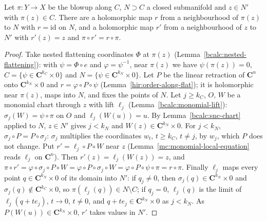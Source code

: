 \begin{lemma}
\label{bcalc:chart-retraction}
\leanok
Let \(\pi\colon Y\to X\) be the blowup along \(C\), \(N\supset C\) a closed submanifold and \(z\in N'\) with \(\pi(z)\in C\). There are a holomorphic map
\(r\) from a neighbourhood of \(\pi(z)\) to \(N\) with \(r=\mathrm{id}\) on \(N\), and a holomorphic map \(r'\) from a neighbourhood of \(z\) to \(N'\) with
\(r'(z)=z\) and \(\pi\circ r'=r\circ\pi\).
\end{lemma}
\begin{proof}
\leanok
Take nested flattening coordinates \(\Phi\) at \(\pi(z)\) (Lemma~\ref{bcalc:nested-flattening}): with \(\psi=\Phi\circ e\) and \(\varphi=\psi^{-1}\), near
\(\pi(z)\) we have \(\psi(\pi(z))=0\), \(C=\{\psi\in\mathbf C^{k_C}\times0\}\) and \(N=\{\psi\in\mathbf C^{k_N}\times0\}\). Let \(P\) be the linear retraction
of \(\mathbf C^n\) onto \(\mathbf C^{k_N}\times0\) and \(r=\varphi\circ P\circ\psi\) (Lemma~\ref{hir:order-along-flat}); it is holomorphic near \(\pi(z)\), maps into
\(N\), and fixes the points of \(N\). Let \(j\ge k_C\), \(O\), \(W\) be a monomial chart through \(z\) with lift \(\ell_j\) (Lemma~\ref{bcalc:monomial-lift}):
\(\sigma_j(W)=\psi\circ\pi\) on \(O\) and \(\ell_j(W(u))=u\). By Lemma~\ref{bcalc:snc-chart} applied to \(N\), \(z\in N'\) gives \(j<k_N\) and
\(W(z)\in\mathbf C^{k_N}\times0\). For \(j<k_N\), \(\sigma_j\circ P=P\circ\sigma_j\): \(\sigma_j\) multiplies the coordinates \(w_t\), \(t\ge k_C\), \(t\ne j\), by
\(w_j\), which \(P\) does not change. Put \(r'=\ell_j\circ P\circ W\) near \(z\) (Lemma~\ref{mc:monomial-local-equation} reads \(\ell_j\) on \(\mathbf C^n\)). Then
\(r'(z)=\ell_j(W(z))=z\), and \(\pi\circ r'=\varphi\circ\sigma_j\circ P\circ W=\varphi\circ P\circ\sigma_j\circ W=\varphi\circ P\circ\psi\circ\pi=r\circ\pi\).
Finally \(\ell_j\) maps every point \(q\in\mathbf C^{k_N}\times0\) of its domain into \(N'\): if \(q_j\ne0\), then \(\sigma_j(q)\in\mathbf C^{k_N}\times0\) and
\(\sigma_j(q)\notin\mathbf C^{k_C}\times0\), so \(\pi(\ell_j(q))\in N\setminus C\); if \(q_j=0\), \(\ell_j(q)\) is the limit of \(\ell_j(q+te_j)\), \(t\to0\),
\(t\ne0\), and \(q+te_j\in\mathbf C^{k_N}\times0\) as \(j<k_N\). As \(P(W(u))\in\mathbf C^{k_N}\times0\), \(r'\) takes values in \(N'\).
\end{proof}

